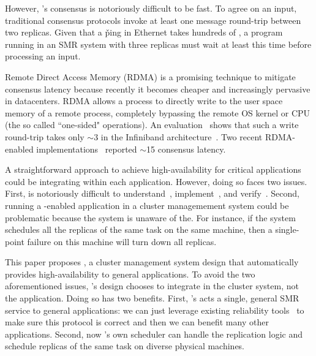 However, \paxos's consensus is notoriously difficult to be fast. 
To agree on an input, traditional consensus protocols invoke at least one 
message round-trip between two replicas. Given that a \v{ping} in Ethernet 
takes hundreds of \us, a program running in an SMR system with three replicas 
must wait at least this time before processing an input. 

Remote Direct Access Memory (RDMA) is a promising technique to mitigate 
consensus latency because recently it becomes cheaper and increasingly 
pervasive in datacenters. RDMA allows a process to directly write to the 
user space memory of a remote process, completely bypassing the remote OS 
kernel or CPU (the so called ``one-sided" operations). An 
evaluation~\cite{pilaf:usenix14} shows that such a write round-trip takes only 
$\sim$3 \us in the Infiniband architecture~\cite{infiniband}. Two recent 
RDMA-enabled \paxos implementations~\cite{dare:hpdc15,falcon:github} reported 
$\sim$15 \us consensus latency.

A straightforward approach to achieve high-availability for critical 
applications could be integrating \paxos within each application. However, 
doing so faces two issues. First, \paxos is notoriously difficult to 
understand~\cite{raft:usenix14}, implement~\cite{paxos:practical}, and 
verify~\cite{demeter:sosp11}. Second, running a \paxos-enabled application in a 
cluster managemement system could be problematic because the system is unaware 
of the. For instance, if the system schedules all the replicas of the same 
task on the same machine, then a single-point failure on this machine 
will turn down all replicas. 


This paper proposes \xxx, a cluster management system design that automatically 
provides high-availability to general applications. To avoid the two 
aforementioned issues, \xxx's design chooses to integrate \paxos in the cluster 
system, not the application. Doing so has two benefits. First, \xxx's \paxos 
acts a single, general SMR service to general applications: we can just 
leverage existing reliability tools~\cite{modist:nsdi09,demeter:sosp11} to make 
sure this \paxos protocol is correct and then we can benefit many other 
applications. Second, now \xxx's own scheduler can handle the replication logic 
and schedule replicas of the same task on diverse physical machines.

